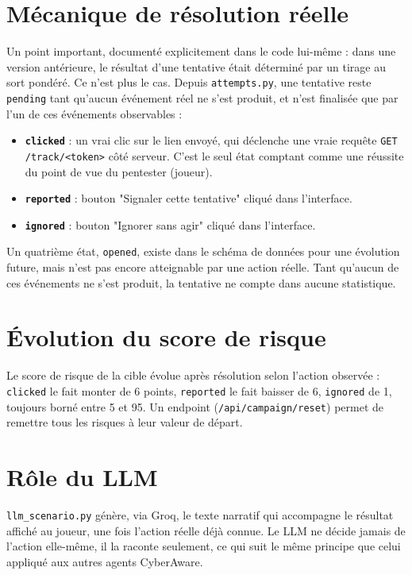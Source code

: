 \documentclass[12pt,a4paper]{report}
\begin{document}
\section{Mécanique de résolution réelle}

Un point important, documenté explicitement dans le code lui-même : dans une version antérieure, le résultat d'une tentative était déterminé par un tirage au sort pondéré. Ce n'est plus le cas. Depuis \texttt{attempts.py}, une tentative reste \texttt{pending} tant qu'aucun événement réel ne s'est produit, et n'est finalisée que par l'un de ces événements observables :

\begin{itemize}[nosep]
\item \textbf{\texttt{clicked}} : un vrai clic sur le lien envoyé, qui déclenche une vraie requête \texttt{GET /track/<token>} côté serveur. C'est le seul état comptant comme une réussite du point de vue du pentester (joueur).
\item \textbf{\texttt{reported}} : bouton "Signaler cette tentative" cliqué dans l'interface.
\item \textbf{\texttt{ignored}} : bouton "Ignorer sans agir" cliqué dans l'interface.
\end{itemize}

Un quatrième état, \texttt{opened}, existe dans le schéma de données pour une évolution future, mais n'est pas encore atteignable par une action réelle. Tant qu'aucun de ces événements ne s'est produit, la tentative ne compte dans aucune statistique.

\section{Évolution du score de risque}

Le score de risque de la cible évolue après résolution selon l'action observée : \texttt{clicked} le fait monter de 6 points, \texttt{reported} le fait baisser de 6, \texttt{ignored} de 1, toujours borné entre 5 et 95. Un endpoint (\texttt{/api/campaign/reset}) permet de remettre tous les risques à leur valeur de départ.

\section{Rôle du LLM}

\texttt{llm\_scenario.py} génère, via Groq, le texte narratif qui accompagne le résultat affiché au joueur, une fois l'action réelle déjà connue. Le LLM ne décide jamais de l'action elle-même, il la raconte seulement, ce qui suit le même principe que celui appliqué aux autres agents CyberAware.
\end{document}
